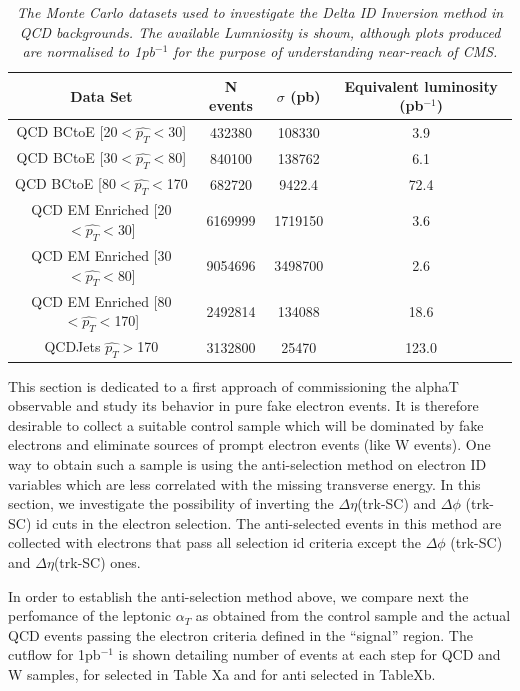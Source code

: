 \documentclass[12pt]{article}
\begin{document}
\begin{table}[h!]
\begin{center}
\begin{tabular}{|c|c|c|c|}
\hline
Data Set & N events & $\sigma$ (pb) & Equivalent luminosity (pb$^{-1}$)\\
\hline
QCD BCtoE [20$<\hat{p_{T}}<$30]& 432380  & 108330 & 3.9\\
QCD BCtoE [30$<\hat{p_{T}}<$80] & 840100 & 138762 & 6.1\\
QCD BCtoE [80$<\hat{p_{T}}<$170 & 682720 & 9422.4 &72.4\\
QCD EM Enriched [20$<\hat{p_{T}}<$30] & 6169999 & 1719150 & 3.6\\
QCD EM Enriched [30$<\hat{p_{T}}<$80] & 9054696 & 3498700 & 2.6\\
QCD EM Enriched [80$<\hat{p_{T}}<$170] & 2492814 & 134088 & 18.6\\
QCDJets $\hat{p_{T}}>$170 & 3132800 & 25470 & 123.0\\
\hline
\end{tabular}
\end{center}
\caption{\textit{The Monte Carlo datasets used to investigate the Delta ID Inversion method in QCD backgrounds. The available Lumniosity is shown, although plots produced are normalised to 1pb$^{-1}$ for the purpose of understanding near-reach of CMS.}}
\label{tab:datasets}
\end{table}

This section is dedicated to a first approach of commissioning the alphaT observable and study its behavior in pure fake electron events. It is therefore desirable to collect a suitable control sample which will be dominated by fake electrons and eliminate sources of prompt electron events (like W events).
One way to obtain such a sample is using the anti-selection method on electron ID variables which are less correlated with the missing transverse energy. In this section, we investigate the possibility of inverting the $\Delta \eta$(trk-SC) and $\Delta \phi$ (trk-SC) id cuts in the electron selection. The anti-selected events in this method are collected with electrons that pass all selection id criteria except the $\Delta \phi$ (trk-SC) and $\Delta \eta$(trk-SC) ones. 

In order to establish the anti-selection method above, we compare next the perfomance of the leptonic $\alpha_T$ as obtained from the control sample and the actual QCD events passing the electron criteria defined in the ``signal'' region. The cutflow for 1pb$^{-1}$ is shown detailing number of events at each step for QCD and W samples, for selected in Table Xa and for anti selected in TableXb. 
\end{document}
